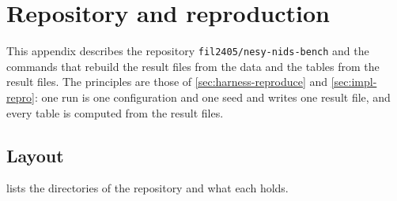 \chapter{Repository and reproduction}
\label{app:repro}

This appendix describes the repository \texttt{fil2405/nesy-nids-bench} and the commands that
rebuild the result files from the data and the tables from the result files. The principles are
those of \cref{sec:harness-reproduce} and \cref{sec:impl-repro}: one run is one configuration and
one seed and writes one result file, and every table is computed from the result files.

\section{Layout}

 lists the directories of the repository and what each holds.

